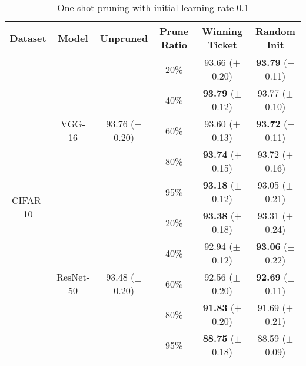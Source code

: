 \setlength{\tabcolsep}{4pt}
\renewcommand{\arraystretch}{1.15}
\begin{table}[!htbp]
\begin{subtable}[b]{\textwidth}
\centering
\small
\begin{tabular}{c|c|cccc}
\hline
Dataset                    & Model                   & Unpruned          & Prune Ratio & Winning Ticket       & Random Init          \\ \hline
\multirow{10}{*}{CIFAR-10} & \multirow{5}{*}{VGG-16} & \multirow{5}{*}{93.76 ($\pm$0.20)}  & 20\%        & 93.66 ($\pm$0.20)          &   \textbf{93.79} ($\pm$0.11)         \\
                           &                         &               & 40\%        &    \textbf{93.79}  ($\pm$0.12)        &  93.77  ($\pm$0.10)      \\
                           &                         &                & 60\%       &    93.60  ($\pm$0.13)        &   \textbf{93.72} ($\pm$0.11)         \\
                           &                         &               & 80\%       &     \textbf{93.74}  ($\pm$0.15)       & 93.72 ($\pm$0.16)           \\
              &                         &               & 95\%       &     \textbf{93.18}  ($\pm$0.12)       & 93.05 ($\pm$0.21)           \\
                  \cline{2-6} 
                           & \multirow{5}{*}{ResNet-50} & \multirow{5}{*}{93.48 ($\pm$0.20)}    & 20\%        &  \textbf{93.38} ($\pm$0.18)          &      93.31  ($\pm$0.24)             \\
                           &                         &                & 40\%        &     92.94  ($\pm$0.12)                 &  \textbf{93.06} ($\pm$0.22)       \\
                           &                         &                & 60\%        & 92.56 ($\pm$0.20)  & \textbf{92.69}  ($\pm$0.11) \\
                     &                         &               & 80\%        & \textbf{91.83} ($\pm$0.20)  & 91.69 ($\pm$0.21) \\
        &                         &               & 95\%        & \textbf{88.75} ($\pm$0.18)  & 88.59 ($\pm$0.09) \\
                    \hline
\end{tabular}
\caption{One-shot pruning with initial learning rate 0.1}
\label{subtable-3}
\end{subtable}

\end{table}
